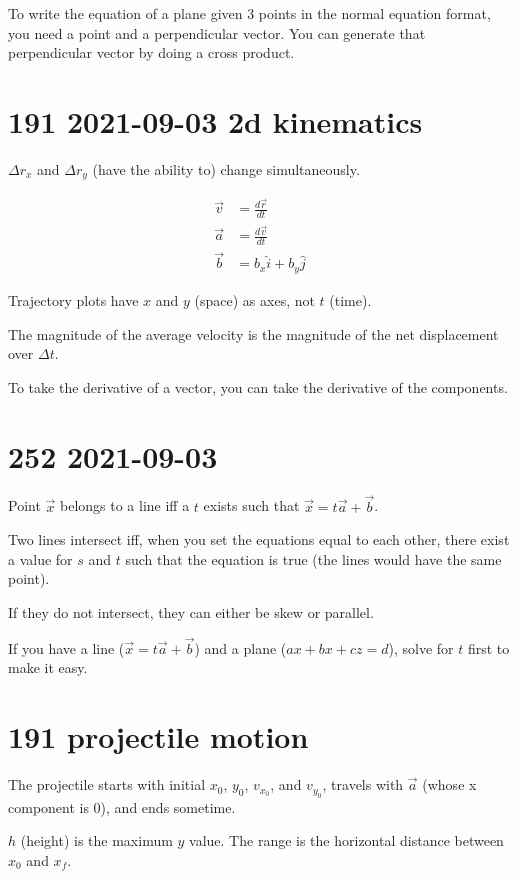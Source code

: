 To write the equation of a plane given 3 points in the normal equation format, you need a point and a perpendicular vector.  You can generate that perpendicular vector by doing a cross product.

\section*{191 2021-09-03 2d kinematics}

$\Delta r_x$ and $\Delta r_y$ (have the ability to) change simultaneously.

\begin{align*}
  \vec v&=\frac{d\vec r}{dt}\\
  \vec a&=\frac{d\vec v}{dt}\\
  \vec b&=b_x\hat i+b_y\hat j
\end{align*}

Trajectory plots have $x$ and $y$ (space) as axes, not $t$ (time).

The magnitude of the average velocity is the magnitude of the net displacement over $\Delta t$.

To take the derivative of a vector, you can take the derivative of the components.

\section*{252 2021-09-03}

Point $\vec x$ belongs to a line iff a $t$ exists such that $\vec x=t\vec a+\vec b$.

Two lines intersect iff, when you set the equations equal to each other, there exist a value for $s$ and $t$ such that the equation is true (the lines would have the same point).

If they do not intersect, they can either be skew or parallel.

If you have a line ($\vec x=t\vec a+\vec b$) and a plane ($ax + bx + cz = d$), solve for $t$ first to make it easy.

\section*{191 projectile motion}

The projectile starts with initial $x_0$, $y_0$, $v_x_0$, and $v_y_0$, travels with $\vec a$ (whose x component is 0), and ends sometime.

$h$ (height) is the maximum $y$ value.  The range is the horizontal distance between $x_0$ and $x_f$.


